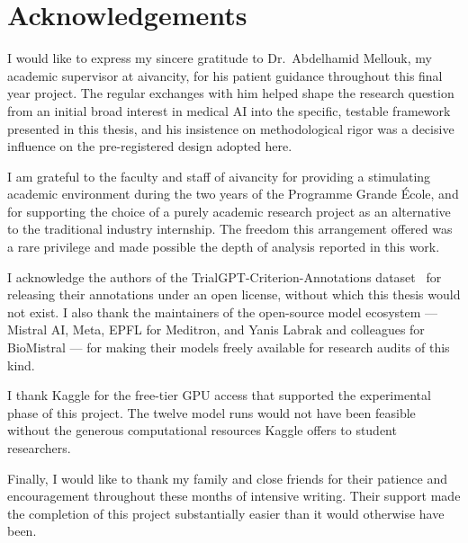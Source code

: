 
\chapter*{Acknowledgements}

I would like to express my sincere gratitude to Dr.\ Abdelhamid Mellouk, my 
academic supervisor at aivancity, for his patient guidance throughout 
this final year project. The regular exchanges with him helped shape 
the research question from an initial broad interest in medical AI 
into the specific, testable framework presented in this thesis, and 
his insistence on methodological rigor was a decisive influence on the 
pre-registered design adopted here.

I am grateful to the faculty and staff of aivancity for providing a 
stimulating academic environment during the two years of the Programme 
Grande École, and for supporting the choice of a purely academic 
research project as an alternative to the traditional industry 
internship. The freedom this arrangement offered was a rare privilege 
and made possible the depth of analysis reported in this work.

I acknowledge the authors of the TrialGPT-Criterion-Annotations 
dataset~\cite{jin2024trialgpt} for releasing their annotations under 
an open license, without which this thesis would not exist. I also 
thank the maintainers of the open-source model ecosystem --- Mistral 
AI, Meta, EPFL for Meditron, and Yanis Labrak and colleagues for 
BioMistral --- for making their models freely available for research 
audits of this kind.

I thank Kaggle for the free-tier GPU access that supported the 
experimental phase of this project. The twelve model runs would not 
have been feasible without the generous computational resources 
Kaggle offers to student researchers.

Finally, I would like to thank my family and close friends for their 
patience and encouragement throughout these months of intensive 
writing. Their support made the completion of this project 
substantially easier than it would otherwise have been.